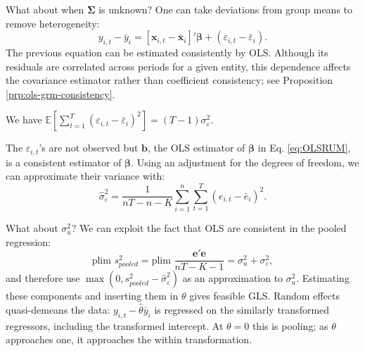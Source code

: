 \documentclass[
  11pt,
]{book}
\theoremstyle{definition}
\theoremstyle{definition}
\theoremstyle{definition}
\theoremstyle{definition}
\theoremstyle{remark}
\begin{document}
What about when \(\boldsymbol\Sigma\) is unknown? One can take deviations from group means to remove heterogeneity:
\begin{equation}
y_{i,t} - \bar{y}_i = [\mathbf{x}_{i,t} - \bar{\mathbf{x}}_i]'\boldsymbol\beta + (\varepsilon_{i,t} - \bar{\varepsilon}_i).\label{eq:OLSRUM}
\end{equation}
The previous equation can be estimated consistently by OLS. Although its residuals are correlated across periods for a given entity, this dependence affects the covariance estimator rather than coefficient consistency; see Proposition \ref{prp:ols-grm-consistency}.

We have \(\mathbb{E}\left[\sum_{t=1}^{T}(\varepsilon_{i,t}-\bar{\varepsilon}_i)^2\right] = (T-1)\sigma_{\varepsilon}^2\).

The \(\varepsilon_{i,t}\)'s are not observed but \(\mathbf{b}\), the OLS estimator of \(\boldsymbol\beta\) in Eq. \eqref{eq:OLSRUM}, is a consistent estimator of \(\boldsymbol\beta\). Using an adjustment for the degrees of freedom, we can approximate their variance with:
\[
\hat{\sigma}_\varepsilon^2 = \frac{1}{nT-n-K}\sum_{i=1}^{n}\sum_{t=1}^{T}(e_{i,t} - \bar{e}_i)^2.
\]

What about \(\sigma_u^2\)? We can exploit the fact that OLS are consistent in the pooled regression:
\[
\mbox{plim }s^2_{pooled} = \mbox{plim }\frac{\mathbf{e}'\mathbf{e}}{nT-K-1} = \sigma_u^2 + \sigma_\varepsilon^2,
\]
and therefore use \(\max(0,s^2_{pooled} - \hat{\sigma}_\varepsilon^2)\) as an approximation to \(\sigma_u^2\). Estimating these components and inserting them in \(\theta\) gives feasible GLS. Random effects quasi-demeans the data: \(y_{i,t}-\hat\theta\bar y_i\) is regressed on the similarly transformed regressors, including the transformed intercept. At \(\theta=0\) this is pooling; as \(\theta\) approaches one, it approaches the within transformation.
\end{document}
